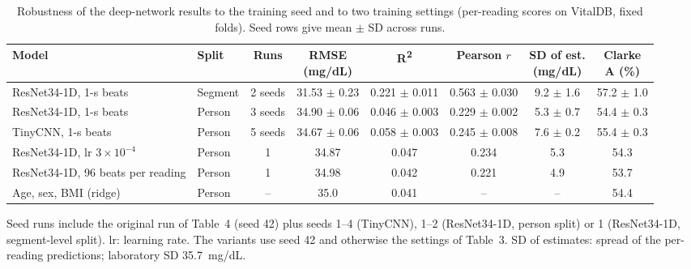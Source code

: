 \documentclass[10pt]{article}
\newcommand{\RR}{R\textsuperscript{2}}
\newcommand{\mgdl}{mg/dL}
\begin{document}
\begin{table}[H]
\centering\footnotesize\setlength{\tabcolsep}{2.6pt}
\begin{threeparttable}
\caption{Robustness of the deep-network results to the training seed and to two training settings (per-reading scores on VitalDB, fixed folds). Seed rows give mean $\pm$ SD across runs.}
\label{tab:robust}
\begin{tabular}{@{}llcccccc@{}}
\toprule
Model & Split & Runs & \makecell{RMSE\\(\mgdl{})} & \RR{} & Pearson $r$ & \makecell{SD of est.\\(\mgdl{})} & \makecell{Clarke\\A (\%)} \\
\midrule
ResNet34-1D, 1-s beats & Segment & 2 seeds & 31.53 $\pm$ 0.23 & 0.221 $\pm$ 0.011 & 0.563 $\pm$ 0.030 & 9.2 $\pm$ 1.6 & 57.2 $\pm$ 1.0 \\
ResNet34-1D, 1-s beats & Person & 3 seeds & 34.90 $\pm$ 0.06 & 0.046 $\pm$ 0.003 & 0.229 $\pm$ 0.002 & 5.3 $\pm$ 0.7 & 54.4 $\pm$ 0.3 \\
TinyCNN, 1-s beats & Person & 5 seeds & 34.67 $\pm$ 0.06 & 0.058 $\pm$ 0.003 & 0.245 $\pm$ 0.008 & 7.6 $\pm$ 0.2 & 55.4 $\pm$ 0.3 \\
\midrule
ResNet34-1D, lr $3\times10^{-4}$ & Person & 1 & 34.87 & 0.047 & 0.234 & 5.3 & 54.3 \\
ResNet34-1D, 96 beats per reading & Person & 1 & 34.98 & 0.042 & 0.221 & 4.9 & 53.7 \\
\midrule
Age, sex, BMI (ridge) & Person & -- & 35.0 & 0.041 & -- & -- & 54.4 \\
\bottomrule
\end{tabular}
\begin{tablenotes}\footnotesize
\item Seed runs include the original run of Table~4 (seed 42) plus seeds 1--4 (TinyCNN), 1--2 (ResNet34-1D, person split) or 1 (ResNet34-1D, segment-level split). lr: learning rate. The variants use seed 42 and otherwise the settings of Table~3. SD of estimates: spread of the per-reading predictions; laboratory SD 35.7~\mgdl{}.
\end{tablenotes}
\end{threeparttable}
\end{table}
\end{document}
